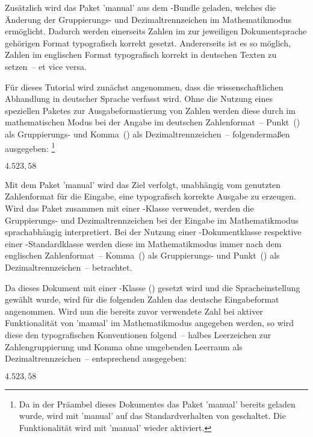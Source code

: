 \documentclass[english,ngerman]{tudscrartcl}
\begin{document}
\begin{Bundle}{}
\begin{Preamble}
\end{Preamble}
%
Zusätzlich wird das Paket 'manual' aus dem \TUDScript-Bundle 
geladen, welches die Änderung der Gruppierungs- und Dezimaltrennzeichen im 
Mathematikmodus ermöglicht. Dadurch werden einerseits Zahlen im zur jeweiligen 
Dokumentsprache gehörigen Format typografisch korrekt gesetzt. Andererseits ist 
es so möglich, Zahlen im englischen Format typografisch korrekt in deutschen 
Texten zu setzen~-- et vice versa.
%
\begin{Preamble}
\usepackage{mathswap}
\end{Preamble}
%
%
Für dieses Tutorial wird zunächst angenommen, dass die wissenschaftlichen 
Abhandlung in deutscher Sprache verfasst wird. Ohne die Nutzung eines 
speziellen Paketes zur Ausgabeformatierung von Zahlen werden diese durch 
 im mathematischen Modus bei der Angabe im deutschen 
Zahlenformat~-- Punkt~() als Gruppierungs- und Komma~(\PValue{,}) als 
Dezimaltrennzeichen~-- folgendermaßen ausgegeben:%
\footnote{%
  Da in der Präambel dieses Dokumentes das Paket 'manual' 
  bereits geladen wurde, wird mit 'manual' auf das 
  Standardverhalten von  geschaltet. Die Funktionalität wird mit 
  'manual' wieder aktiviert.%
}
%
\begin{Trunk*}
\mathswapoff
\(4.523,58\)
\mathswapon

\end{Trunk*}
%
Mit dem Paket 'manual' wird das Ziel verfolgt, unabhängig vom 
genutzten Zahlenformat für die Eingabe, eine typografisch korrekte Ausgabe zu 
erzeugen. Wird das Paket zusammen mit einer \TUDScript-Klasse verwendet, werden 
die Gruppierungs- und Dezimaltrennzeichen bei der Eingabe im Mathematikmodus 
sprachabhängig interpretiert. Bei der Nutzung einer \KOMAScript-Dokumentklasse 
respektive einer -Standardklasse werden diese im Mathematikmodus 
immer nach dem englischen Zahlenformat~-- Komma~(\PValue{,}) als Gruppierungs- 
und Punkt~(\PValue{,}) als Dezimaltrennzeichen~-- betrachtet.

Da dieses Dokument mit einer \TUDScript-Klasse (\TUDClassName) gesetzt wird und 
die Spracheinstellung~ gewählt wurde, wird für die folgenden 
Zahlen das deutsche Eingabeformat angenommen. Wird nun die bereits zuvor 
verwendete Zahl bei aktiver Funktionalität von 'manual' im 
Mathematikmodus angegeben werden, so wird diese den typografischen Konventionen 
folgend~-- halbes Leerzeichen zur Zahlengruppierung und Komma ohne umgebenden 
Leerraum als Dezimaltrennzeichen~-- entsprechend ausgegeben:
%
\begin{Trunk*}
\(4.523,58\)


\end{Trunk*}
\end{Bundle}
\end{document}
